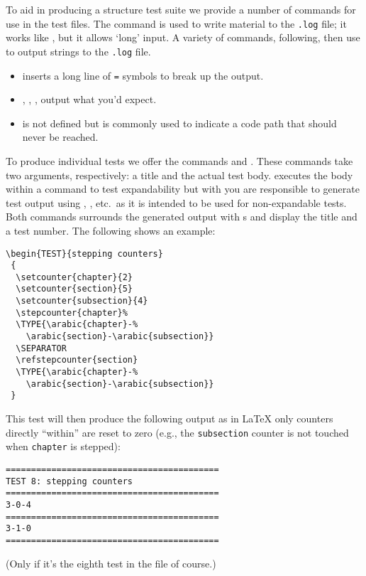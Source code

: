 \documentclass[a4paper]{ltugboat}
\begin{document}
To aid in producing a structure test suite we provide a number of
commands for use in the test files.  The  command is used to write
material to the \texttt{.log} file; it works like , but it
allows `long' input.
%
A variety of commands, following, then use  to output strings
to the \texttt{.log} file.
\begin{itemize}
\item
{} inserts a long line of \texttt{=} symbols to break up
the output.
\item
{}, , ,  output what you'd expect.
\item
{} is not defined but is commonly used to indicate a code path
that should never be reached.
\end{itemize}
To produce individual tests we offer the commands  and
. These commands take two arguments, respectively: a title
and the actual test body.   executes the body within a
 command to test expandability but with  you are
responsible to generate test output using , ,
etc.\ as it is intended to be used for non-expandable tests.
Both  commands  surrounds the generated output with s and 
display the title and a test number. The following shows an example:
\begin{Verbatim}
\begin{TEST}{stepping counters}
 {
  \setcounter{chapter}{2}
  \setcounter{section}{5}
  \setcounter{subsection}{4}
  \stepcounter{chapter}%
  \TYPE{\arabic{chapter}-%
    \arabic{section}-\arabic{subsection}}
  \SEPARATOR
  \refstepcounter{section}
  \TYPE{\arabic{chapter}-%
    \arabic{section}-\arabic{subsection}}
 }
\end{Verbatim}
This test will then produce the following output as in \LaTeX{} only
counters directly ``within'' are reset to zero (e.g., the
\texttt{subsection} counter is not touched when \texttt{chapter} is stepped):
\begin{Verbatim}
==========================================
TEST 8: stepping counters
==========================================
3-0-4
==========================================
3-1-0
==========================================
\end{Verbatim}
(Only if it's the eighth test in the file of course.)



\end{document}
